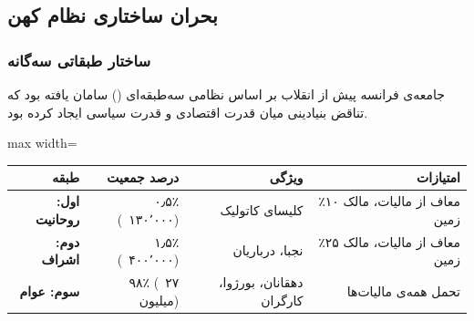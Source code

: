 \subsection{بحران ساختاری نظام کهن}
\label{sec:ancien}

\subsubsection{ساختار طبقاتی سه‌گانه}

جامعه‌ی فرانسه پیش از انقلاب بر اساس نظامی سه‌طبقه‌ای
() سامان یافته بود که تناقض بنیادینی میان قدرت اقتصادی
و قدرت سیاسی ایجاد کرده بود.

\begin{center}
\begin{adjustbox}{max width=\linewidth}%
\begin{tabular}{rrrr}
\toprule
\rowcolor{PrimaryDeep}
\color{white}\bfseries طبقه & \color{white}\bfseries درصد جمعیت
  & \color{white}\bfseries ویژگی & \color{white}\bfseries امتیازات \\
\midrule
\rowcolor{BgWarm}
\textbf{اول: روحانیت} & ۰٫۵٪ (~۱۳۰٬۰۰۰) & کلیسای کاتولیک
  & معاف از مالیات، مالک ۱۰٪ زمین \\
\rowcolor{BgCool}
\textbf{دوم: اشراف} & ۱٫۵٪ (~۴۰۰٬۰۰۰) & نجبا، درباریان
  & معاف از مالیات، مالک ۲۵٪ زمین \\
\rowcolor{BgWarm}
\textbf{سوم: عوام} & ۹۸٪ (~۲۷ میلیون) & دهقانان، بورژوا، کارگران
  & تحمل همه‌ی مالیات‌ها \\
\bottomrule
\end{tabular}
\end{adjustbox}
\end{center}

\begin{tcolorbox}[wavebox, title={\rl{تناقض بنیادین}}]
\begin{center}
\end{center}
\end{tcolorbox}

